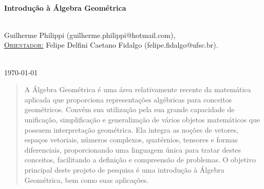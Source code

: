 \documentclass[11pt]{article}
\begin{document}
\begin{titlepage}


\HRule \\[0.4cm]
{ \LARGE \bfseries Introdução à Álgebra Geométrica} \\ [0.4cm] %
\HRule \\[2.5cm]
 

\begin{minipage}{1\textwidth}
	\begin{center} \large
		Guilherme Philippi (guilherme.philippi@hotmail.com),
		\vspace{0.5cm}
		\\
		\underline{\textsc{Orientador:}} \vspace{0.2cm}
		Felipe Delfini Caetano Fidalgo (felipe.fidalgo@ufsc.br).
	\end{center}
\end{minipage} \\[2cm]


{\large \today} %


\vfill %

\end{titlepage}


\begin{abstract}
	A Álgebra Geométrica é uma área relativamente recente da matemática aplicada que proporciona representações algébricas para conceitos geométricos. Convém sua utilização pela sua grande capacidade de unificação, simplificação e generalização de vários objetos matemáticos que possuem interpretação geométrica. Ela integra as noções de vetores, espaços vetoriais, números complexos, quatérnios, tensores e formas diferenciais, proporcionando uma linguagem única para tratar destes conceitos, facilitando a definição e compreensão de problemas. O objetivo principal deste projeto de pesquisa é uma introdução à Álgebra Geométrica, bem como suas aplicações.
\end{abstract}
\end{document}
